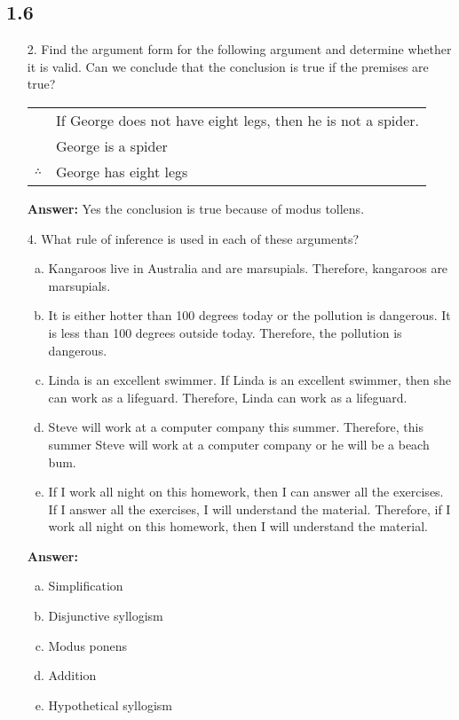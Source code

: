 \subsection{1.6}
\begin{itemize}
    \item[2.] Find the argument form for the following argument and determine whether it is valid. Can we conclude that the conclusion is true if the premises are true?
          \vspace{5mm} %

          \begin{tabular}{rl}
                           & If George does not have eight legs, then he is not a spider. \\
                           & George is a spider                                           \\
              \hline
              $\therefore$ & George has eight legs \vspace{3mm}                           %
          \end{tabular}

          \textbf{Answer: }
          Yes the conclusion is true because of modus tollens.

    \item[4.] What rule of inference is used in each of these arguments?
          \begin{enumerate}[a.]
              \item Kangaroos live in Australia and are marsupials. Therefore, kangaroos are marsupials.
              \item It is either hotter than 100 degrees today or the pollution is dangerous. It is less than 100 degrees outside today. Therefore, the pollution is dangerous.
              \item Linda is an excellent swimmer. If Linda is an excellent swimmer, then she can work as a lifeguard. Therefore, Linda can work as a lifeguard.
              \item Steve will work at a computer company this summer. Therefore, this summer Steve will work at a computer company or he will be a beach bum.
              \item If I work all night on this homework, then I can answer all the exercises. If I answer all the exercises, I will understand the material. Therefore, if I work all night on this homework, then I will understand the material.
          \end{enumerate}
          \textbf{Answer:}
          \begin{enumerate}[a.]
              \item Simplification
              \item Disjunctive syllogism
              \item Modus ponens
              \item Addition
              \item Hypothetical syllogism
          \end{enumerate}


\end{itemize}

